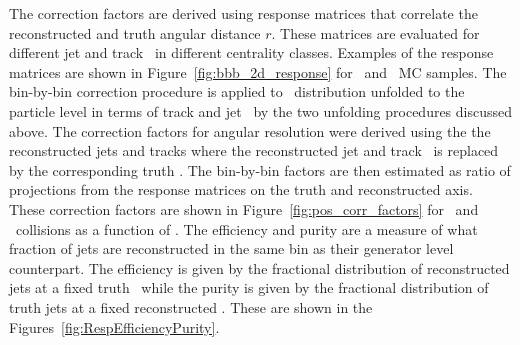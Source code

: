 The correction factors are derived using response matrices that correlate the reconstructed and truth angular distance $r$.
These matrices are evaluated for different jet and track \pT\ in different centrality classes.
Examples of the response matrices are shown in Figure~\ref{fig:bbb_2d_response} for \pbpb\ and \pp\ MC samples.
The bin-by-bin correction procedure is applied to \Dptr\ distribution unfolded to the particle level in terms of track and jet \pT\ by the two unfolding procedures discussed above.
The correction factors for angular resolution were derived using the the reconstructed jets and tracks where the reconstructed jet and track \pT\ is replaced by the corresponding truth \pT.
The bin-by-bin factors are then estimated as ratio of projections from the response matrices on the truth and reconstructed axis.
These correction factors are shown in Figure~\ref{fig:pos_corr_factors} for \pbpb\ and \pp\ collisions as a function of \rvar.
The efficiency and purity are a measure of what fraction of jets are reconstructed in the same bin as their generator level counterpart.
The efficiency is given by the fractional distribution of reconstructed jets at a fixed truth \ptjet\ while the purity is given by the fractional distribution of truth jets at a fixed reconstructed \ptjet.
These are shown in the Figures~\ref{fig:RespEfficiencyPurity}.


